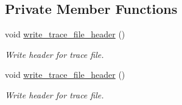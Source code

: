\subsection*{Private Member Functions}
\begin{DoxyCompactItemize}
\item 
void \hyperlink{classOscRingNStProblem_a96e12e5bb761d765ebe9065b9990112f}{write\+\_\+trace\+\_\+file\+\_\+header} ()
\begin{DoxyCompactList}\small\item\em Write header for trace file. \end{DoxyCompactList}\item 
void \hyperlink{classOscRingNStProblem_a96e12e5bb761d765ebe9065b9990112f}{write\+\_\+trace\+\_\+file\+\_\+header} ()
\begin{DoxyCompactList}\small\item\em Write header for trace file. \end{DoxyCompactList}\end{DoxyCompactItemize}
